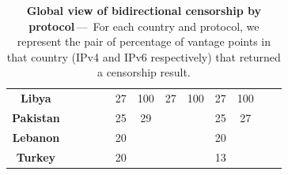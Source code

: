 {\begin{table}
\begin{tabular}{|c|cc|cc|cc|cc|cc|cc|}
    \textbf{Libya}                                &    &                                                                                        &    &                                                                                             & 27 & 100                                                                                         & 27 & 100                                 & 27 & 100                                                                                        &    &                               \\
    \textbf{Pakistan}                             &    &                                                                                        &    &                                                                                             & 25 & 29                                                                                          &    &                                     & 25 & 27                                                                                         &    &                               \\
    \textbf{Lebanon}                              &    &                                                                                        &    &                                                                                             & 20 &                                                                                             &    &                                     & 20 &                                                                                            &    &                               \\
    \textbf{Turkey}                               &    &                                                                                        &    &                                                                                             & 20 &                                                                                             &    &                                     & 13 &                                                                                            &    &                               \\
    \hline
    \end{tabular}
    \caption{\textbf{Global view of bidirectional censorship by protocol}\,---\,
        For each country and protocol,
        we represent the pair of percentage of vantage points in that country (IPv4 and IPv6 respectively) that returned a censorship result.
    }
    \label{fig:prevalencegeneral}
    \end{table}
}

